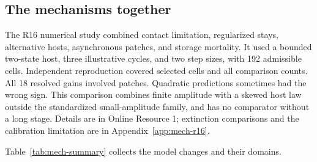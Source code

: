\subsection{The mechanisms together}
The R16 numerical study combined contact limitation, regularized stays, alternative hosts, asynchronous patches, and storage mortality. It used a bounded two-state host, three illustrative cycles, and two step sizes, with 192 admissible cells. Independent reproduction covered selected cells and all comparison counts. All 18 resolved gains involved patches. Quadratic predictions sometimes had the wrong sign. This comparison combines finite amplitude with a skewed host law outside the standardized small-amplitude family, and has no comparator without a long stage. Details are in Online Resource 1; extinction comparisons and the calibration limitation are in Appendix~\ref{app:mech-r16}.

Table~\ref{tab:mech-summary} collects the model changes and their domains.

